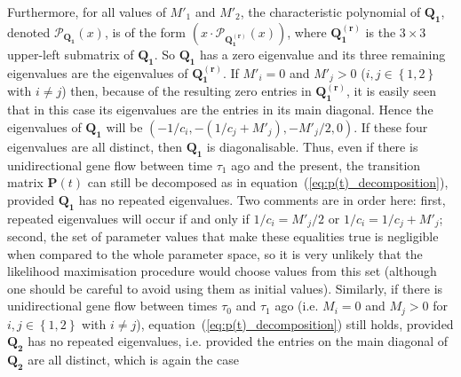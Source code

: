 \documentclass[11pt]{article}
\begin{document}
Furthermore, for all values of $M'_1$ and $M'_2$, the characteristic polynomial of $\mathbf{Q_1}$, denoted $\mathcal{P}_{\mathbf{Q_1}}(x)$, is of the form $\left(x \cdot \mathcal{P}_{\mathbf{Q_1^{\left(r\right)}}}(x) \right)$, where $\mathbf{Q_1^{\left(r\right)}}$ is the $3 \times 3$ upper-left submatrix of $\mathbf{Q_1}$. So $\mathbf{Q_1}$ has a zero eigenvalue and its three remaining eigenvalues are the eigenvalues of $\mathbf{Q_1^{\left(r\right)}}$. 
If $M'_{i}=0$ and $M'_{j}>0$  ($i, j \in \left\lbrace 1,2 \right\rbrace$ with $i \neq j$) 
then, because of the resulting zero entries in $\mathbf{Q_1^{\left(r\right)}}$, it is easily seen that in this case
its eigenvalues are the entries in its main diagonal. 
Hence the eigenvalues of $\mathbf{Q_1}$ will be $\left(-1/c_{i} ,  -(1/c_{j}+M'_{j} ) , -M'_{j}/2 , 0 \right)$. 
If these four eigenvalues are all distinct, then $\mathbf{Q_1}$ is diagonalisable.
Thus, even if there is unidirectional gene flow between time $\tau_{1}$ ago and the present, 
the transition matrix $\mathbf{P}(t)$ can still be decomposed as in equation~(\ref{eq:p(t)_decomposition}), 
provided $\mathbf{Q_1}$ has no repeated eigenvalues.
Two comments are in order here: first, repeated eigenvalues will occur if and only if $1/c_{i} = M'_{j}/2 $ or $1/c_{i} = 1/c_{j}+M'_{j}$;
 second, the set of parameter values that make these equalities true is negligible when compared to the whole parameter space, so it is very unlikely that the likelihood maximisation procedure would choose values from this set (although one should be careful to avoid using them as initial values). 
Similarly, if there is unidirectional gene flow between times $\tau_{0}$ and $\tau_{1}$ ago (i.e. $M_{i}=0$ and $M_{j}>0$ for  $i, j \in \left\lbrace 1,2 \right\rbrace$ with $i \neq j$), equation~(\ref{eq:p(t)_decomposition}) still holds, provided $\mathbf{Q_2}$ has no repeated eigenvalues, i.e. provided the entries on the main diagonal of $\mathbf{Q_2}$ are all distinct, which is again the case 
\end{document}
